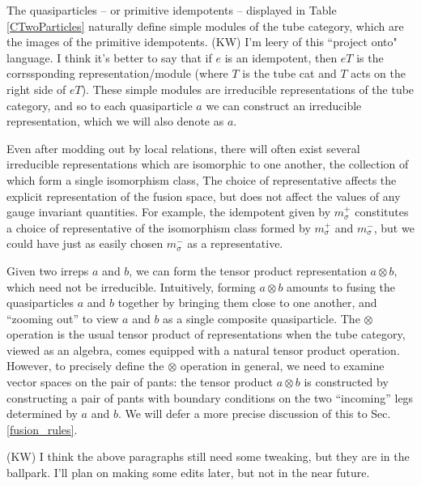 \documentclass[12pt,a4paper]{article}
\newcommand{\tp}{\otimes}
\newcommand{\kw}[1]{{\color{kwcolor}\footnotesize{(KW) #1}}}
\begin{document}
The quasiparticles -- or primitive idempotents -- displayed in Table \ref{CTwoParticles} naturally define simple modules of the tube category, which are the images of the primitive idempotents.
\kw{I'm leery of this ``project onto" language.
I think it's better to say that if $e$ is an idempotent, then $eT$ is the corrssponding
representation/module (where $T$ is the tube cat and $T$ acts on the right side of $eT$).}
These simple modules are irreducible representations 
of the tube category, and so to each quasiparticle $a$ we can construct an irreducible representation, which we will also denote as $a$. 

Even after modding out by local relations, there will often exist several irreducible representations which are isomorphic to one another, the collection of which form a single isomorphism class, 
The choice of representative affects the explicit representation of the fusion space, but does not affect the values of any gauge invariant quantities. 
For example, the idempotent given by ${m_\sigma^+}$ constitutes a choice of representative of the isomorphism class formed by $m_\sigma^+$ and $m_\sigma^-$, but we could have just as easily chosen ${m_\sigma^-}$ as a representative.

Given two irreps $a$ and $b$, we can form the tensor product representation $a\tp b$, which need not be irreducible.
Intuitively, forming $a\tp b$ amounts to fusing the quasiparticles $a$ and $b$ together by bringing them close to one another, and ``zooming out'' to view $a$ and $b$ as a single composite quasiparticle. 
The $\tp$ operation is the usual tensor product of representations when the tube category, viewed as an algebra, comes equipped with a natural tensor product operation. 
However, to precisely define the $\tp$ operation in general, we need to examine vector spaces on the pair of pants: the tensor product $a \tp b$ is constructed by constructing a pair of pants with 
boundary conditions on the two ``incoming'' legs determined by $a$ and $b$.
We will defer a more precise discussion of this to Sec. \ref{fusion_rules}. 

\kw{I think the above paragraphs still need some tweaking, but they are in the ballpark.
I'll plan on making some edits later, but not in the near future.}
\end{document}
